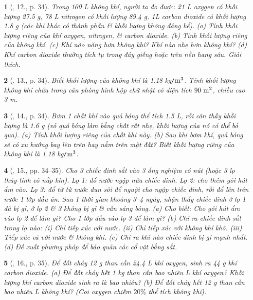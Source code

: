\documentclass{article}
\newtheorem{baitoan}{}
\begin{document}
\begin{baitoan}[\cite{ncpt_KHTN_6_tap_1}, 12., p. 34]
	Trong {\rm100 L} không khí, người ta đo được: {\rm21 L} oxygen có khối lượng {\rm27.5 g, \rm78 L} nitrogen có khối lượng {\rm89.4 g, 1L} carbon dioxide có khối lượng {\rm1.8 g} (các khí khác có thành phần \& khối lượng không đáng kể). (a) Tính khối lượng riêng của khí oxygen, nitrogen, \& carbon dioxide. (b) Tính khối lượng riêng của không khí. (c) Khí nào nặng hơn không khí? Khí nào nhẹ hơn không khí? (d) Khí carbon dioxide thường tích tụ trong đáy giếng hoặc trên nền hang sâu. Giải thích.
\end{baitoan}

\begin{baitoan}[\cite{ncpt_KHTN_6_tap_1}, 13., p. 34]
	Biết khối lượng của không khí là {\rm1.18 kg{\tt/}$\rm m^3$}. Tính khối lượng không khí chứa trong căn phòng hình hộp chữ nhật có diện tích $\rm90\ m^2$, chiều cao {\rm3 m}.
\end{baitoan}

\begin{baitoan}[\cite{ncpt_KHTN_6_tap_1}, 14., p. 34]
	Bơm 1 chất khí vào quả bóng thể tích {\rm1.5 L}, rồi cân thấy khối lượng là {\rm1.6 g} (vỏ quá bóng làm bằng chất rất nhẹ, khối lượng của nó có thể bỏ qua). (a) Tính khối lượng riêng của chất khí này. (b) Sau khi bơm khí, quả bóng sẽ có xu hướng bay lên trên hay nằm trên mặt đất? Biết khối lượng riêng của không khí là {\rm1.18 kg{\tt/}$\rm m^3$}.
\end{baitoan}

\begin{baitoan}[\cite{ncpt_KHTN_6_tap_1}, 15., pp. 34--35]
	Cho 3 chiếc đinh sắt vào 3 ống nghiệm có nút (hoặc 3 lọ thủy tinh có nắp kín). Lọ 1: đổ nước ngập nửa chiếc đinh. Lọ 2: cho thêm gói hút ẩm vào. Lọ 3: đổ từ từ nước đun sôi để nguội cho ngập chiếc đinh, rồi đổ lên trên nước 1 lớp dầu ăn. Sau 1 thời gian khoảng 3--4 ngày, nhận thấy chiếc đinh ở lọ 1 đã bị gỉ, ở lọ 2 \& 3 không bị gỉ \& vẫn sáng bóng. (a) Cho biết: Cho gói hút ẩm vào lọ 2 để làm gì? Cho 1 lớp dầu vào lọ 3 để làm gì? (b) Chỉ ra chiếc đinh sắt trong lọ nào: (i) Chỉ tiếp xúc với nước. (ii) Chỉ tiếp xúc với không khí khô. (iii) Tiếp xúc cả với nước \& không khí. (c) Chỉ ra khi nào chiếc đinh bị gỉ mạnh nhất. (d) Đề xuất phương pháp để bảo quản các cổ vật bằng sắt.
\end{baitoan}

\begin{baitoan}[\cite{ncpt_KHTN_6_tap_1}, 16., p. 35]
	Để đốt cháy {\rm12 g} than cần {\rm24.4 L} khí oxygen, sinh ra {\rm44 g} khí carbon dioxide. (a) Để đốt cháy hết {\rm1 kg} than cần bao nhiêu {\rm L} khí oxygen? Khối lượng khí carbon dioxide sinh ra là bao nhiêu? (b) Để đốt cháy hết {\rm12 g} than cần bao nhiêu {\rm L} không khí? (Coi oxygen chiếm $20\%$ thể tích không khí).
\end{baitoan}
\end{document}
